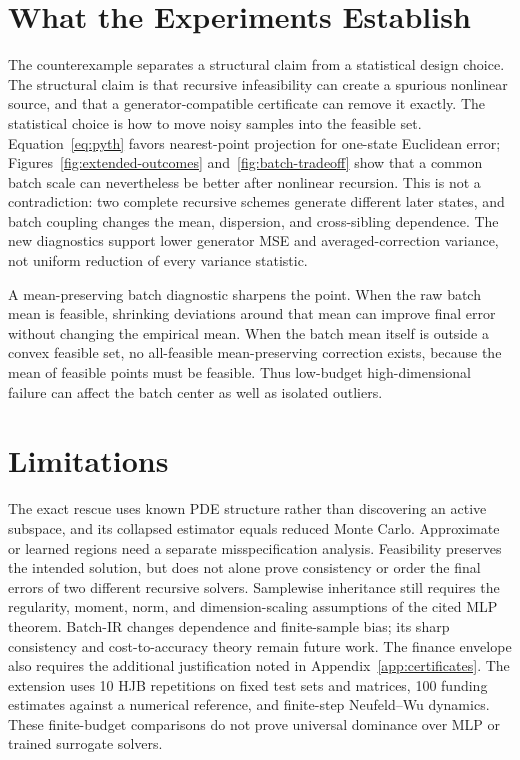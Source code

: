 \documentclass{article}
\begin{document}
\section{What the Experiments Establish}
The counterexample separates a structural claim from a statistical design choice. The structural claim is that recursive infeasibility can create a spurious nonlinear source, and that a generator-compatible certificate can remove it exactly. The statistical choice is how to move noisy samples into the feasible set. Equation~\eqref{eq:pyth} favors nearest-point projection for one-state Euclidean error; Figures~\ref{fig:extended-outcomes} and~\ref{fig:batch-tradeoff} show that a common batch scale can nevertheless be better after nonlinear recursion. This is not a contradiction: two complete recursive schemes generate different later states, and batch coupling changes the mean, dispersion, and cross-sibling dependence. The new diagnostics support lower generator MSE and averaged-correction variance, not uniform reduction of every variance statistic.

A mean-preserving batch diagnostic sharpens the point. When the raw batch mean is feasible, shrinking deviations around that mean can improve final error without changing the empirical mean. When the batch mean itself is outside a convex feasible set, no all-feasible mean-preserving correction exists, because the mean of feasible points must be feasible. Thus low-budget high-dimensional failure can affect the batch center as well as isolated outliers.

\section{Limitations}
The exact rescue uses known PDE structure rather than discovering an active subspace, and its collapsed estimator equals reduced Monte Carlo. Approximate or learned regions need a separate misspecification analysis. Feasibility preserves the intended solution, but does not alone prove consistency or order the final errors of two different recursive solvers. Samplewise inheritance still requires the regularity, moment, norm, and dimension-scaling assumptions of the cited MLP theorem. Batch-IR changes dependence and finite-sample bias; its sharp consistency and cost-to-accuracy theory remain future work. The finance envelope also requires the additional justification noted in Appendix~\ref{app:certificates}. The extension uses 10 HJB repetitions on fixed test sets and matrices, 100 funding estimates against a numerical reference, and finite-step Neufeld--Wu dynamics. These finite-budget comparisons do not prove universal dominance over MLP or trained surrogate solvers.
\end{document}
